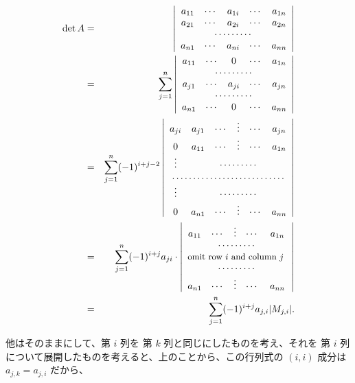 \begin{eqnarray*}
\det A & = & \left|\begin{array}{ccccc}a_{11} & \cdots & a_{1i} & \cdots & a_{1n}\\
a_{21} & \cdots & a_{2i} & \cdots & a_{2n}\\
\multicolumn{5}{c}{\cdots\cdots\cdots}\\
a_{n1} & \cdots & a_{ni} & \cdots & a_{nn}
\end{array}\right|\\
& = & \sum_{j = 1}^n \left|\begin{array}{ccccc}
a_{11} & \cdots & 0 & \cdots & a_{1n}\\
\multicolumn{5}{c}{\cdots\cdots\cdots}\\
a_{j1} & \cdots & a_{ji} & \cdots & a_{jn}\\
\multicolumn{5}{c}{\cdots\cdots\cdots}\\
a_{n1} & \cdots & 0 & \cdots & a_{nn}
\end{array}\right|\\
& = & \sum_{j = 1}^n (-1)^{i+j-2}\left|\begin{array}{cccccc}
a_{ji} & a_{j1} & \cdots & \vdots & \cdots & a_{jn}\\
0  & a_{11} & \cdots &\vdots & \cdots & a_{1n}\\
\vdots & \multicolumn{5}{c}{\cdots\cdots\cdots}\\
\multicolumn{6}{c}{\dotfill}\\
\vdots & \multicolumn{5}{c}{\cdots\cdots\cdots}\\
0 & a_{n1} & \cdots & \vdots  & \cdots & a_{nn}
\end{array}\right|\\
& = &  \sum_{j = 1}^n (-1)^{i+j}a_{ji}\cdot\left|\begin{array}{ccccc}
a_{11} & \cdots & \vdots & \cdots & a_{1n}\\
\multicolumn{5}{c}{\cdots\cdots\cdots}\\
\multicolumn{5}{c}{\mbox{{\small omit row $i$ and column $j$ }}}\\
\multicolumn{5}{c}{\cdots\cdots\cdots}\\
a_{n1} & \cdots &\vdots & \cdots & a_{nn}
\end{array}\right|\\
& = & \sum_{j = 1}^n(-1)^{i+j}a_{j,i}|M_{j,i}|.
\end{eqnarray*}

他はそのままにして、第 $i$ 列を 第 $k$ 列と同じにしたものを考え、それを 第 $i$ 列について展開したものを考えると、上のことから、この行列式の $(i,i)$ 成分は $a_{j,k} = a_{j,i}$ だから、

